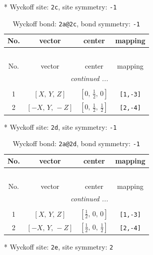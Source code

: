 \documentclass[fleqn,8pt]{jsarticle}
\begin{document}
* Wyckoff site: {\tt 2c}, site symmetry: {\tt -1}
\renewcommand{\arraystretch}{1.2}
\begin{longtable}{cccc}
\caption{Wyckoff bond: {\tt 2a@2c}, bond symmetry: {\tt -1}}
 \\
 \hline \hline
No. & vector & center & mapping \\ \hline \endfirsthead

\multicolumn{3}{l}{\tablename\ \thetable{}} \\
 \hline \hline
No. & vector & center & mapping \\ \hline \endhead

 \hline \hline
\multicolumn{3}{r}{\footnotesize\it continued ...} \\ \endfoot

 \hline \hline
\multicolumn{3}{r}{} \\ \endlastfoot

1 & $\left[ X,\, Y,\, Z \right]$ & $\left[ 0,\, \frac{1}{2},\, 0 \right]$ & {\tt [1,-3]} \\ \hline
2 & $\left[ - X,\, Y,\, - Z \right]$ & $\left[ 0,\, \frac{1}{2},\, \frac{1}{2} \right]$ & {\tt [2,-4]} \\
\end{longtable}
* Wyckoff site: {\tt 2d}, site symmetry: {\tt -1}
\renewcommand{\arraystretch}{1.2}
\begin{longtable}{cccc}
\caption{Wyckoff bond: {\tt 2a@2d}, bond symmetry: {\tt -1}}
 \\
 \hline \hline
No. & vector & center & mapping \\ \hline \endfirsthead

\multicolumn{3}{l}{\tablename\ \thetable{}} \\
 \hline \hline
No. & vector & center & mapping \\ \hline \endhead

 \hline \hline
\multicolumn{3}{r}{\footnotesize\it continued ...} \\ \endfoot

 \hline \hline
\multicolumn{3}{r}{} \\ \endlastfoot

1 & $\left[ X,\, Y,\, Z \right]$ & $\left[ \frac{1}{2},\, 0,\, 0 \right]$ & {\tt [1,-3]} \\ \hline
2 & $\left[ - X,\, Y,\, - Z \right]$ & $\left[ \frac{1}{2},\, 0,\, \frac{1}{2} \right]$ & {\tt [2,-4]} \\
\end{longtable}
* Wyckoff site: {\tt 2e}, site symmetry: {\tt 2}
\renewcommand{\arraystretch}{1.2}
\end{document}
